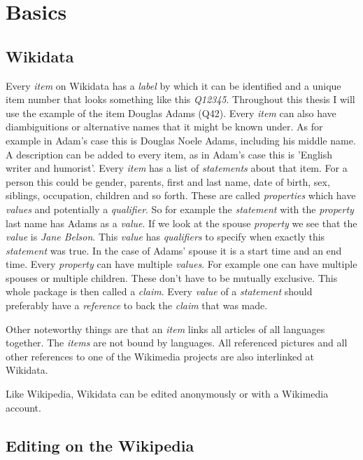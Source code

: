 \chapter{Basics}

\section{Wikidata}

Every \textit{item} on Wikidata has a \textit{label} by which it can be identified and a unique item number that looks something like this \textit{Q12345}. Throughout this thesis I will use the example of the item Douglas Adams (Q42). Every \textit{item} can also have diambiguitions or alternative names that it might be known under. As for example in Adam's case this is Douglas Noele Adams, including his middle name. A description can be added to every item, as in Adam's case this is 'English writer and humorist'. Every \textit{item} has a list of \textit{statements} about that item. For a person this could be gender, parents, first and last name, date of birth, sex, siblings, occupation, children and so forth. These are called \textit{properties} which have \textit{values} and potentially a \textit{qualifier}. So for example the \textit{statement} with the \textit{property} last name has Adams as a \textit{value}. If we look at the spouse \textit{property} we see that the \textit{value} is \textit{Jane Belson}. This \textit{value} has \textit{qualifiers} to specify when exactly this \textit{statement} was true. In the case of Adams' spouse it is a start time and an end time. Every \textit{property} can have multiple \textit{values}. For example one can have multiple spouses or multiple children. These don't have to be mutually exclusive. This whole package is then called a \textit{claim}. Every \textit{value} of a \textit{statement} should preferably have a \textit{reference} to back the \textit{claim} that was made. 

Other noteworthy things are that an \textit{item} links all articles of all languages together. The \textit{items} are not bound by languages. All referenced pictures and all other references to one of the Wikimedia projects are also interlinked at Wikidata. 

Like Wikipedia, Wikidata can be edited anonymously or with a Wikimedia account. 

\clearpage
\section{Editing on the Wikipedia}

